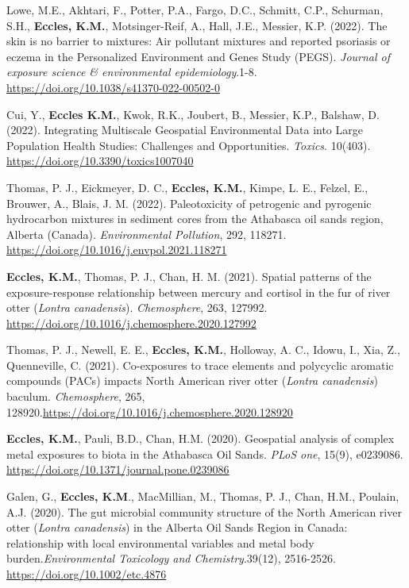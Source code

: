 \documentclass[margin,line]{res}
\begin{document}
\begin{resume}
Lowe, M.E., Akhtari, F., Potter, P.A., Fargo, D.C., Schmitt, C.P., Schurman, S.H., \textbf{Eccles, K.M.}, Motsinger-Reif, A., Hall, J.E., Messier, K.P. (2022). The skin is no barrier to mixtures: Air pollutant mixtures and reported
psoriasis or eczema in the Personalized Environment and Genes Study (PEGS). \textit{Journal of exposure science \& environmental epidemiology}.1-8. \url{https://doi.org/10.1038/s41370-022-00502-0}

Cui, Y., \textbf{Eccles K.M.}, Kwok, R.K., Joubert, B., Messier, K.P., Balshaw, D. (2022). Integrating Multiscale Geospatial Environmental Data into Large Population Health Studies: Challenges and Opportunities. \textit{Toxics}. 10(403). \url{https://doi.org/10.3390/toxics1007040}

 Thomas, P. J., Eickmeyer, D. C., \textbf{Eccles, K.M.}, Kimpe, L. E., Felzel, E., Brouwer, A., Blais, J. M. (2022). Paleotoxicity of petrogenic and pyrogenic hydrocarbon mixtures in sediment cores from the Athabasca oil sands region, Alberta (Canada). \textit{Environmental Pollution}, 292, 118271. \url{https://doi.org/10.1016/j.envpol.2021.118271}

\textbf{Eccles, K.M.}, Thomas, P. J., Chan, H. M. (2021). Spatial patterns of the exposure-response relationship between mercury and cortisol in the fur of river otter (\textit{Lontra canadensis}). \textit{Chemosphere}, 263, 127992. \url{https://doi.org/10.1016/j.chemosphere.2020.127992}

Thomas, P. J., Newell, E. E., \textbf{Eccles, K.M.}, Holloway, A. C., Idowu, I., Xia, Z., Quenneville, C. (2021). Co-exposures to trace elements and polycyclic aromatic compounds (PACs) impacts North American river otter (\textit{Lontra canadensis}) baculum. \textit{Chemosphere}, 265, 128920.\url{https://doi.org/10.1016/j.chemosphere.2020.128920}

\textbf{Eccles, K.M.}, Pauli, B.D., Chan, H.M. (2020). Geospatial analysis of complex metal exposures to biota in the Athabasca Oil Sands. \textit{PLoS one}, 15(9), e0239086. \url{https://doi.org/10.1371/journal.pone.0239086}

Galen, G., \textbf{Eccles, K.M}., MacMillian, M., Thomas, P. J., Chan, H.M., Poulain, A.J. (2020). The gut microbial community structure of the North American river otter (\textit{Lontra canadensis}) in the Alberta Oil Sands Region in Canada: relationship with local environmental variables and metal body burden.\textit{Environmental Toxicology and Chemistry}.39(12), 2516-2526. \url{https://doi.org/10.1002/etc.4876}


\end{resume}
\end{document}
